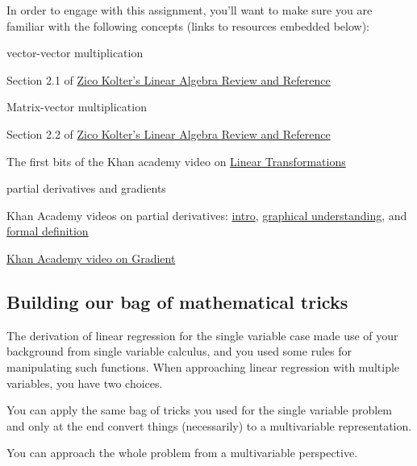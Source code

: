 \documentclass[assignment02_Solutions]{subfiles}
\begin{document}
\vspace{1em}
\begin{recall}
In order to engage with this assignment, you'll want to make sure you are familiar with the following concepts (links to resources embedded below):
\bi
\item vector-vector multiplication
\bi
\item Section 2.1 of \href{https://see.stanford.edu/materials/aimlcs229/cs229-linalg.pdf}{Zico Kolter's Linear Algebra Review and Reference}
\ei
\item Matrix-vector multiplication
\bi
\item Section 2.2 of \href{https://see.stanford.edu/materials/aimlcs229/cs229-linalg.pdf}{Zico Kolter's Linear Algebra Review and Reference}
\item The first bits of the Khan academy video on \href{https://www.khanacademy.org/math/linear-algebra/matrix-transformations/linear-transformations/v/matrix-vector-products-as-linear-transformations}{Linear Transformations}
\ei
\item partial derivatives and gradients
\bi
\item Khan Academy videos on partial derivatives: \href{https://www.khanacademy.org/math/multivariable-calculus/multivariable-derivatives/partial-derivatives/v/partial-derivatives-introduction}{intro}, \href{https://www.khanacademy.org/math/multivariable-calculus/multivariable-derivatives/partial-derivatives/v/partial-derivatives-and-graphs}{graphical understanding}, and \href{https://www.khanacademy.org/math/multivariable-calculus/multivariable-derivatives/partial-derivatives/v/formal-definition-of-partial-derivatives}{formal definition}
\item \href{https://www.khanacademy.org/math/multivariable-calculus/multivariable-derivatives/gradient-and-directional-derivatives/v/gradient}{Khan Academy video on Gradient}
\ei
\ei
\end{recall}


\subsection{Building our bag of mathematical tricks}

The derivation of linear regression for the single variable case made use of your background from single variable calculus, and you used some rules for manipulating such functions.  When approaching linear regression with multiple variables, you have two choices.
\be
\item You can apply the same bag of tricks you used for the single variable problem and only at the end convert things (necessarily) to a multivariable representation.  
\item You can approach the whole problem from a multivariable perspective.
\ee
\end{document}
